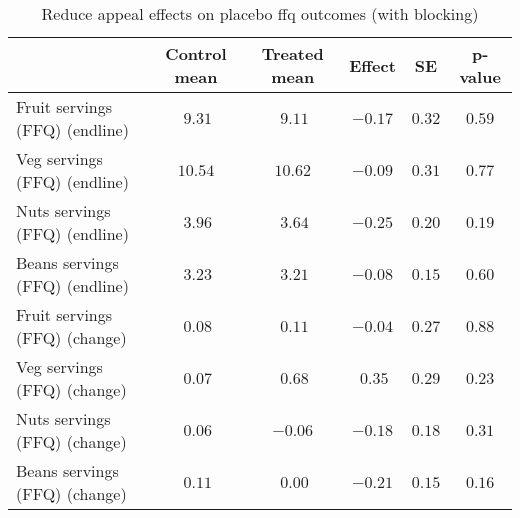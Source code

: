 \begin{table*}[ht]
\caption{Reduce appeal effects on placebo ffq outcomes (with blocking)\label{round}} 
\begin{center}
\begin{tabular}{lccccc}
\hline\hline
\multicolumn{1}{l}{}&\multicolumn{1}{c}{Control mean}&\multicolumn{1}{c}{Treated mean}&\multicolumn{1}{c}{Effect}&\multicolumn{1}{c}{SE}&\multicolumn{1}{c}{p-value}\tabularnewline
\hline
Fruit servings (FFQ) (endline)&$~9.31$&$~9.11$&$-0.17$&$0.32$&$0.59$\tabularnewline
Veg servings (FFQ) (endline)&$10.54$&$10.62$&$-0.09$&$0.31$&$0.77$\tabularnewline
Nuts servings (FFQ) (endline)&$~3.96$&$~3.64$&$-0.25$&$0.20$&$0.19$\tabularnewline
Beans servings (FFQ) (endline)&$~3.23$&$~3.21$&$-0.08$&$0.15$&$0.60$\tabularnewline
Fruit servings (FFQ) (change)&$~0.08$&$~0.11$&$-0.04$&$0.27$&$0.88$\tabularnewline
Veg servings (FFQ) (change)&$~0.07$&$~0.68$&$~0.35$&$0.29$&$0.23$\tabularnewline
Nuts servings (FFQ) (change)&$~0.06$&$-0.06$&$-0.18$&$0.18$&$0.31$\tabularnewline
Beans servings (FFQ) (change)&$~0.11$&$~0.00$&$-0.21$&$0.15$&$0.16$\tabularnewline
\hline
\end{tabular}\end{center}

\end{table*}
